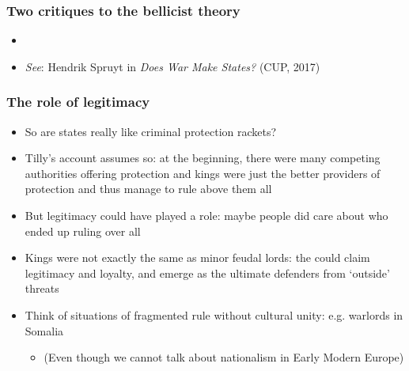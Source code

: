 \documentclass[utf8, xcolor=dvipsnames, handout]{beamer}
\begin{document}
\begin{frame}
\frametitle{Two critiques to the bellicist theory}
\centering

\begin{itemize}
  \item[]
  \item[] {\small \textit{See}: Hendrik Spruyt in \textit{Does War Make States?} (CUP, 2017)}
\end{itemize}

\end{frame}

\begin{frame}
\frametitle{The role of legitimacy}
\centering

\begin{itemize}[<+->]
  \item So are states really like criminal protection rackets?
  \item Tilly's account assumes so: at the beginning, there were many competing authorities offering protection and kings were just the better providers of protection and thus manage to rule above them all
  \item But legitimacy could have played a role: maybe people did care about who ended up ruling over all
  \item Kings were not exactly the same as minor feudal lords: the could claim legitimacy and loyalty, and emerge as the ultimate defenders from `outside' threats
  \item Think of situations of fragmented rule without cultural unity: e.g. warlords in Somalia
  \begin{itemize}
    \item (Even though we cannot talk about nationalism in Early Modern Europe)
  \end{itemize}
\end{itemize}

\end{frame}
\end{document}
